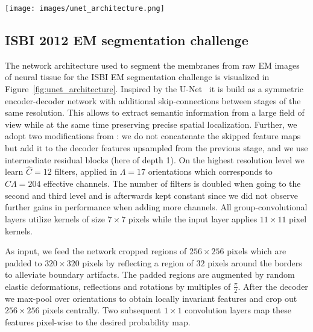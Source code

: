 \documentclass[10pt,twocolumn,letterpaper]{article}
\begin{document}
\begin{figure*}
	\centering
	\texttt{[image: images/unet\_architecture.png]}
	\caption{
		Network architecture used to predict the membrane probability map for the ISBI 2012 EM segmentation challenge.
		The topology is inspired by the U-Net \cite{ronneberger2015u} and FusionNet \cite{quan2016fusionnet} but uses the proposed steerable group-convolution layers with $\Lambda=17$ orientations.
		To mitigate boundary artifacts we feed reflect-padded images into the network.
	}
	\label{fig:unet_architecture}
\end{figure*}


\subsection{ISBI 2012 EM segmentation challenge}

The network architecture used to segment the membranes from raw EM images of neural tissue for the ISBI EM segmentation challenge is visualized in Figure~\ref{fig:unet_architecture}.
Inspired by the U-Net~\cite{ronneberger2015u} it is build as a symmetric encoder-decoder network with additional skip-connections between stages of the same resolution.
This allows to extract semantic information from a large field of view while at the same time preserving precise spatial localization.
Further, we adopt two modifications from \cite{quan2016fusionnet}: we do not concatenate the skipped feature maps but add it to the decoder features upsampled from the previous stage, and we use intermediate residual blocks (here of depth 1).
On the highest resolution level we learn $\hat{C}=12$ filters, applied in $\Lambda=17$ orientations which corresponds to $\hat{C}\Lambda=204$ effective channels.
The number of filters is doubled when going to the second and third level and is afterwards kept constant since we did not observe further gains in performance when adding more channels.
All group-convolutional layers utilize kernels of size $7\times7$ pixels while the input layer applies $11\times11$ pixel kernels.

As input, we feed the network cropped regions of $256\times256$ pixels which are padded to $320\times320$ pixels by reflecting a region of $32$ pixels around the borders to alleviate boundary artifacts.
The padded regions are augmented by random elastic deformations, reflections and rotations by multiples of $\frac{\pi}{2}$.
After the decoder we max-pool over orientations to obtain locally invariant features and crop out $256\times256$ pixels centrally.
Two subsequent $1\times1$ convolution layers map these features pixel-wise to the desired probability map.
\end{document}
